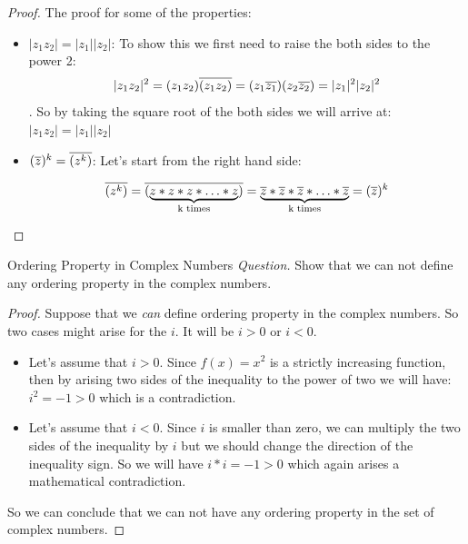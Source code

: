 \begin{proof}
The proof for some of the properties: \\
\begin{itemize}
\item $|z_1 z_2|= |z_1||z_2|$: To show this we first need to raise the both sides to the power 2:
\[ |z_1 z_2|^2 = (z_1 z_2)\overline{(z_1 z_2)} = (z_1 \overline{z_1})(z_2 \overline{z_2}) = |z_1|^2|z_2|^2 \]. So by taking the square root of the both sides we will arrive at: $|z_1 z_2| = |z_1||z_2|$

\item $(\overline{z})^k = \overline{(z^k)}$: Let's start from the right hand side:

\[ \overline{(z^k)} = \overline{(\underbrace{z*z*z*\ldots*z}_\text{k times})} = \underbrace{\overline{z}*\overline{z}*\overline{z}*\ldots*\overline{z}}_\text{k times} = (\overline{z})^k\]
\end{itemize}

\end{proof}


\begin{example}{Ordering Property in Complex Numbers}
\emph{Question.} Show that we can not define any ordering property in the complex numbers.

\begin{proof}
Suppose that we \emph{can} define ordering property in the complex numbers. So two cases might arise for the $i$. It will be $i>0$ or $i<0$. 

\begin{itemize}
\item Let's assume that $i>0$. Since $f(x) = x^2$ is a strictly increasing function, then by arising two sides of the inequality to the power of two we will have: $i^2 = -1 > 0$ which is a contradiction.

\item Let's assume that $i<0$. Since $i$ is smaller than zero, we can multiply the two sides of the inequality by $i$ but we should change the direction of the inequality sign. So we will have $i*i = -1 > 0$ which again arises a mathematical contradiction.
\end{itemize}

So we can conclude that we can not have any ordering property in the set of complex numbers.

\end{proof}

\end{example}

